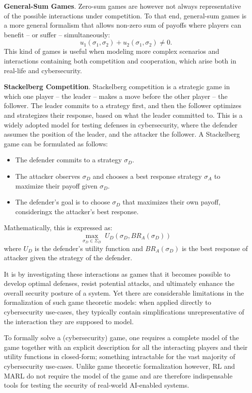 \textbf{General-Sum Games}. Zero-sum games are however not always representative of the possible interactions under competition.
To that end, general-sum games is a more general formalism that allows non-zero sum of payoffs where players can benefit -- or suffer -- simultaneously:
\[
u_1(\sigma_1, \sigma_2) + u_2(\sigma_1, \sigma_2) \neq 0.
\]
This kind of games is useful when modeling more complex scenarios and interactions containing both competition and cooperation, which arise both in real-life and cybersecurity.

\textbf{Stackelberg Competition}. Stackelberg competition is a strategic game in which one player -- the leader -- makes a move before the other player -- the follower.
The leader commits to a strategy first, and then the follower optimizes and strategizes their response, based on what the leader committed to.
This is a widely adopted model for testing defenses in cybersecurity, where the defender assumes the position of the leader, and the attacker the follower.
A Stackelberg game can be formulated as follows:

\begin{itemize}
    \item The defender commits to a strategy $\sigma_D$.
    \item The attacker observes $\sigma_D$ and chooses a best response strategy $\sigma_A$ to maximize their payoff given $\sigma_D$.
    \item The defender's goal is to choose $\sigma_D$ that maximizes their own payoff, consideringx the attacker's best response.
\end{itemize}

Mathematically, this is expressed as:
\[
\max_{\sigma_D \in \Sigma_D} \; U_D(\sigma_D, BR_A(\sigma_D))
\]
where $U_D$ is the defender's utility function and $BR_A(\sigma_D)$ is the best response of attacker given the strategy of the defender.

It is by investigating these interactions as games that it becomes possible to develop optimal defenses, resist potential attacks, and ultimately enhance the overall security posture of a system.
Yet there are considerable limitations in the formalization of such game theoretic models: when applied directly to cybersecurity use-cases, they typically contain simplifications unrepresentative of the interaction they are supposed to model.

To formally solve a (cybersecurity) game, one requires a complete model of the game together with an explicit description for all the interacting players and their utility functions in closed-form; something intractable for the vast majority of cybersecurity use-cases.
Unlike game theoretic formalization however, \gls{RL} and \gls{MARL} do not require the model of the game and are therefore indispensable tools for testing the security of real-world AI-enabled systems.

